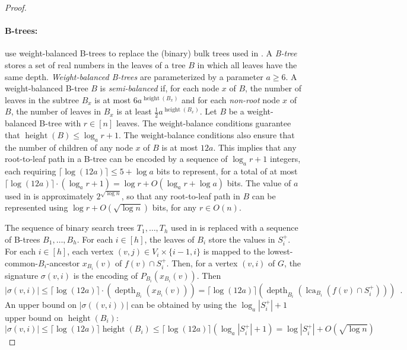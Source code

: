 \documentclass{patmorin}
\renewcommand{\ge}{\geqslant}
\renewcommand{\le}{\leqslant}
\newcommand{\defin}[1]{\emph{\textcolor{brightmaroon}{#1}}}
\DeclareMathOperator{\height}{height}
\DeclareMathOperator{\depth}{depth}
\DeclareMathOperator{\lca}{lca}
\newcommand{\Oh}{O}
\begin{document}
\begin{proof}
  \paragraph{B-trees:}
  \citet{gawrychowski.janczewski:simpler} use
  weight-balanced B-trees to replace the (binary) bulk trees used in \cite{dujmovic.esperet.ea:adjacency}.
  A \defin{B-tree} stores a set of real numbers in the leaves of a tree $B$ in which all leaves have the same depth.
  \defin{Weight-balanced B-trees} are parameterized by a parameter $a\ge 6$.  A weight-balanced B-tree $B$ is \defin{semi-balanced} if, for each node $x$ of $B$, the number of leaves in the subtree $B_x$ is at most $6a^{\height(B_x)}$ and for each \emph{non-root} node $x$ of $B$, the number of leaves in $B_x$ is at least $\tfrac{1}{2}a^{\height(B_x)}$.
  Let $B$ be a weight-balanced B-tree with $r\in [n]$ leaves.  The weight-balance conditions guarantee that $\height(B)\le \log_a r + 1$.
  The weight-balance conditions also ensure that the number of children of any node $x$ of $B$ is at most $12a$.
  This implies that any root-to-leaf path in a B-tree can be encoded by a sequence of $\log_a r+1$ integers, each requiring $\lceil\log(12a)\rceil\le 5+\log a$ bits to represent, for a total of at most $\lceil\log(12a)\rceil\cdot(\log_a r+1)=\log r + \Oh(\log_a r + \log a)$ bits.
  The value of $a$ used in \cite{gawrychowski.janczewski:simpler} is approximately $2^{\sqrt{\log n}}$, so that any root-to-leaf path in $B$ can be represented using $\log r + \Oh(\sqrt{\log n})$ bits, for any $r\in\Oh(n)$.

  The sequence of binary search trees $T_1,\ldots,T_h$ used in \cite{gawrychowski.janczewski:simpler} is replaced with a sequence of B-trees $B_1,\ldots,B_h$.
  For each $i\in[h]$, the leaves of $B_i$ store the values in $S^+_i$.
  For each $i\in[h]$, each vertex $(v,j)\in V_i\times\{i-1,i\}$ is mapped to the lowest-common-$B_i$-ancestor $x_{B_i}(v)$ of $f(v)\cap S^+_i$.
  Then, for a vertex $(v,i)$ of $G$, the signature \defin{$\sigma(v,i)$} is the encoding of $P_{B_i}(x_{B_i}(v))$.
  Then
  \[
    |\sigma(v,i)| \le \lceil\log (12a)\rceil\cdot(\depth_{B_i}(x_{B_i}(v))) = \lceil\log (12a)\rceil(\depth_{B_i}(\lca_{B_i}(f(v)\cap S_i^+))) \enspace .
  \]
  An upper bound on $|\sigma((v,i))|$ can be obtained by using the $\log_a |S^+_i|+1$ upper bound on $\height(B_i)$:
  \[
    |\sigma(v,i)|\le \lceil\log (12a)\rceil\height(B_i) \le \lceil\log (12a)\rceil(\log_a |S^+_i| + 1)= \log |S^+_i| + \Oh(\sqrt{\log n})
  \]


\end{proof}
\end{document}
